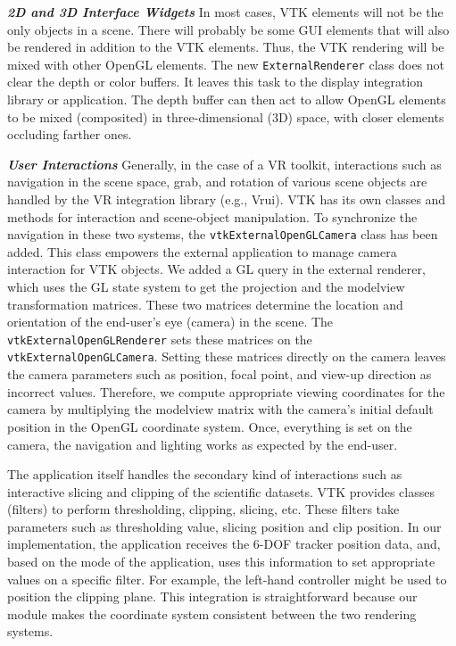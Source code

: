 \textbf{\textit{2D and 3D Interface Widgets}} In most cases, VTK elements will not be the only objects in a scene.
There will probably be some GUI elements that will also be rendered in addition to the VTK elements.
Thus, the VTK rendering will be mixed with other OpenGL elements.
The new \texttt{ExternalRenderer} class does not clear the depth or color buffers. It leaves this task to the display integration library or application.
The depth buffer can then act to allow OpenGL elements to be mixed (composited)
in three-dimensional (3D) space, with closer elements occluding farther ones.

\textbf{\textit{User Interactions}} Generally, in the case of a VR toolkit, interactions such as navigation in the scene space, grab, and rotation of various scene objects are handled by the VR integration library (e.g., Vrui).
VTK has its own classes and methods for interaction and scene-object manipulation.
To synchronize the navigation in these two systems, the \texttt{vtkExternalOpenGLCamera} class has been added.
This class empowers the external application to manage camera interaction for VTK objects.
We added a GL query in the external renderer, which uses the GL state system to get the projection and the modelview transformation matrices.
These two matrices determine the location and orientation of the end-user's eye
(camera) in the scene.
The \texttt{vtkExternalOpenGLRenderer} sets these matrices on the \texttt{vtkExternalOpenGLCamera}.
Setting these matrices directly on the camera leaves the camera parameters such as position, focal point, and view-up direction as incorrect values. Therefore, we compute appropriate viewing coordinates for the camera by multiplying the modelview matrix with the camera's initial default position in the OpenGL coordinate system. 
Once, everything is set on the camera, the navigation and lighting works as expected by the end-user.

The application itself handles the secondary kind of interactions such as interactive slicing and clipping of the scientific datasets.
VTK provides classes (filters) to perform thresholding, clipping, slicing, etc.
These filters take parameters such as thresholding value, slicing position and clip position. 
In our implementation, the application receives the 6-DOF tracker position data, and, based on the mode of the application, uses this information to set appropriate values on a specific filter.
For example, the left-hand controller might be used to position the clipping plane.
This integration is straightforward because our module makes the coordinate system consistent between the two rendering systems.

